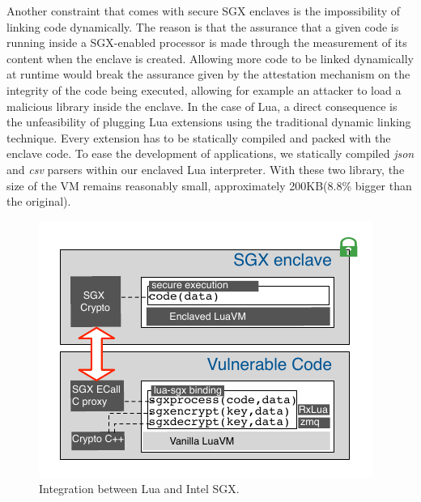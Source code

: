 Another constraint that comes with secure SGX enclaves is the impossibility of linking code dynamically. 
The reason is that the assurance that a given code is running inside a SGX-enabled processor is made through the measurement of its content when the enclave is created.
Allowing more code to be linked dynamically at runtime would break the assurance given by the attestation mechanism on the integrity of the code being executed, allowing for example an attacker to load a malicious library inside the enclave.
In the case of Lua, a direct consequence is the unfeasibility of plugging Lua extensions using the traditional dynamic linking technique. 
Every extension has to be statically compiled and packed with the enclave code. 
To ease the development of \SYS applications, we statically compiled \emph{json} \cite{rfc7159} and \emph{csv}\cite{rfc4180} parsers within our enclaved Lua interpreter.
With these two library, the size of the VM remains reasonably small, approximately 200KB(8.8\% bigger than the original).

\begin{figure}[t!]
  \centering
  \includegraphics[scale=0.85]{images/arch-sgxlua.pdf}
  \caption{Integration between Lua and Intel SGX.}
  \label{fig:arch-luasgx}
\end{figure}


